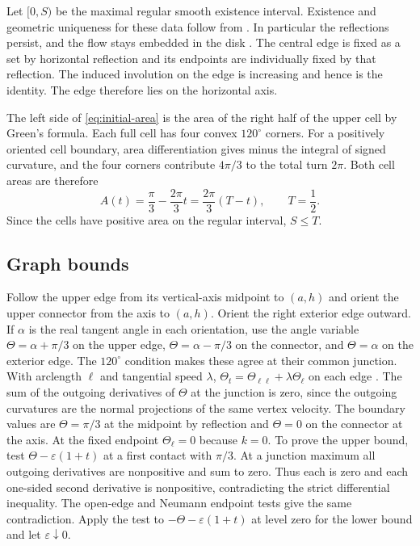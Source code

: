 Let \([0,S)\) be the maximal regular smooth existence interval.
Existence and geometric uniqueness for these data follow from
\cite[Theorem~3.29 and Corollary~3.34]{survey}. In particular the
reflections persist, and the flow stays embedded in the disk
\cite[Proposition~8.12]{survey}. The central edge is fixed as a set by
horizontal reflection and its endpoints are individually fixed by that
reflection. The induced involution on the edge is increasing and hence
is the identity. The edge therefore lies on the horizontal axis.

The left side of \eqref{eq:initial-area} is the area of the right half
of the upper cell by Green's formula. Each full cell has four convex
\(120^\circ\) corners. For a positively oriented cell boundary, area
differentiation gives minus the integral of signed curvature, and
the four corners contribute \(4\pi/3\) to the total turn \(2\pi\).
Both cell areas are therefore
\begin{equation}
 A(t)=\frac{\pi}{3}-\frac{2\pi}{3}t
      =\frac{2\pi}{3}(T-t),\qquad T=\frac12 .
 \label{eq:area-law}
\end{equation}
Since the cells have positive area on the regular interval, \(S\le T\).

\subsection{Graph bounds}

Follow the upper edge from its vertical-axis midpoint to \((a,h)\) and
orient the upper connector from the axis to \((a,h)\). Orient the right
exterior edge outward. If \(\alpha\) is the real tangent angle in each
orientation, use the angle variable \(\Theta=\alpha+\pi/3\) on the upper
edge, \(\Theta=\alpha-\pi/3\) on the connector, and \(\Theta=\alpha\)
on the exterior edge. The \(120^\circ\) condition makes these agree
at their common junction. With arclength \(\ell\) and tangential
speed \(\lambda\), \(\Theta_t=\Theta_{\ell\ell}+\lambda\Theta_\ell\)
on each edge \cite[\S3 and (8.4)]{ins}. The sum of the outgoing
derivatives of \(\Theta\) at the junction is zero, since the outgoing
curvatures are the normal projections of the same vertex velocity.
The boundary values are \(\Theta=\pi/3\) at the midpoint by reflection
and \(\Theta=0\) on the connector at the axis. At the fixed endpoint
\(\Theta_\ell=0\) because \(k=0\). To prove the upper bound, test \(\Theta-\varepsilon(1+t)\) at a first
contact with \(\pi/3\). At a junction maximum all outgoing derivatives
are nonpositive and sum to zero. Thus each is zero and each one-sided
second derivative is nonpositive, contradicting the strict differential
inequality. The open-edge and Neumann endpoint tests give the same
contradiction. Apply the test to \(-\Theta-\varepsilon(1+t)\) at level
zero for the lower bound and let \(\varepsilon\downarrow0\).

